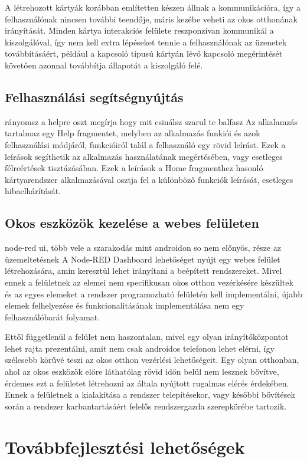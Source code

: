 \documentclass[
]{thesis-ekf}
\theoremstyle{definition}
\theoremstyle{remark}
\begin{document}
A létrehozott kártyák korábban említetten készen állnak a kommunikációra, így a felhasználónak nincsen további teendője,
máris kezébe veheti az okos otthonának irányítását. Minden kártya interakciós felülete reszponzívan kommunikál
a kiszolgálóval, így nem kell extra lépéseket tennie a felhasználónak az üzenetek továbbításáért, például a kapcsoló
típusú kártyán lévő kapcsoló megérintését követően azonnal továbbítja állapotát a kiszolgáló felé.

\section{Felhasználási segítségnyújtás}
rányomsz a helpre oszt megírja hogy mit csinálsz szarul te balfasz
Az alkalamzás tartalmaz egy Help fragmentet, melyben az alkalmazás funkiói és azok felhasználási módjáról,
funkcióiról talál a felhasználó egy rövid leírást. Ezek a leírások segíthetik az alkalmazás használatának
megértésében, vagy esetleges félreértések tisztázásában. Ezek a leírások a Home fragmenthez hasonló kártyarendszer
alkalmazásával osztja fel a különböző funkciók leírását, esetleges hibaelhárítását.

\section{Okos eszközök kezelése a webes felületen}
node-red ui, több vele a szarakodás mint androidon so nem előnyös, része az üzemeltetésnek
A Node-RED Dashboard lehetőséget nyújt egy webes felület létrehozására, amin keresztül lehet irányítani a beépített
rendszereket. Mivel ennek a felületnek az elemei nem specifikusan okos otthon vezérkésére készültek és az egyes
elemeket a rendszer programozható felületén kell implementálni, újabb elemek felhelyezése és funkcionalitásának
implementálása nem egy felhasználóbarát folyamat.

Ettől függetlenül a felület nem haszontalan, mivel egy olyan irányítőközpontot lehet rajta prezentálni, amit nem csak
androidos telefonon lehet elérni, így szélesebb körűvé teszi az okos otthon vezérlési lehetőségeit. Egy olyan otthonban,
ahol az okos eszközök előre láthatólag rövid időn belül nem lesznek bővítve, érdemes ezt a felületet létrehozni az
általa nyújtott rugalmas elérés érdekében. Ennek a felületnek a kialakítása a rendszer telepítésekor, vagy későbbi
bővítések során a rendszer karbantartásáért felelős rendszergazda szerepkörébe tartozik.

\chapter{Továbbfejlesztési lehetőségek}
\end{document}

